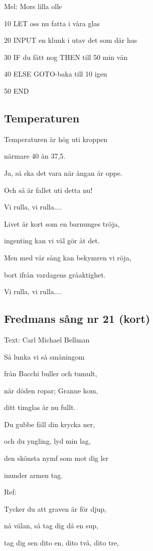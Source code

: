 Mel: Mors lilla olle\bigskip

10 LET oss nu fatta i våra glas

20 INPUT en klunk i utav det som där has

30 IF du fått nog THEN till 50 min vän

40 ELSE GOTO-baka till 10 igen

50 END

\subsection{\textbf{Temperaturen}}

Temperaturen är hög uti kroppen

närmare 40 än 37,5.

Ja, så ska det vara när ångan är oppe.

Och så är fallet uti detta nu!\bigskip

Vi rulla, vi rulla....\bigskip

Livet är kort som en barnunges tröja,

ingenting kan vi väl gör åt det.

Men med vår sång kan bekymren vi röja,

bort ifrån vardagens gråaktighet.\bigskip

Vi rulla, vi rulla.... \bigskip

\subsection{\textbf{Fredmans sång nr 21 (kort)}}

Text: Carl Michael Bellman\bigskip



Så lunka vi så småningom

från Bacchi buller och tumult,

när döden ropar; Granne kom,

ditt timglas är nu fullt.

Du gubbe fäll din krycka ner,

och du yngling, lyd min lag,

den skönsta nymf som mot dig ler

inunder armen tag.\bigskip

Ref:

Tycker du att graven är för djup,

nå välan, så tag dig då en sup,

tag dig sen dito en, dito två, dito tre,

